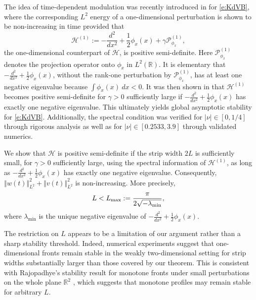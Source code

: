 \documentclass[final,11pt]{article}
\theoremstyle{definition} %
\newcommand{\lv}{\left\Vert}
\newcommand{\rv}{\right\Vert}
\theoremstyle{plain}
\theoremstyle{definition} %
\theoremstyle{remark}
\begin{document}
The idea of time-dependent modulation was recently introduced in \cite{BARKER2025} for \eqref{e:KdVB}, where the corresponding $L^2$ energy of a one-dimensional perturbation is shown to be non-increasing in time provided that 
\[
\mathcal{H}^{(1)}:=-\frac{d^2}{dx^2}+ \frac { 1 } { 2 } \phi _ { x }(x) + \gamma \mathcal{P}^{(1)}_{\phi_x},
\]
the one-dimensional counterpart of $\mathcal{H}$, is positive semi-definite. Here $\mathcal{P}^{(1)}_{\phi_x}$ denotes the projection operator onto $\phi_x$ in $L^2(\mathbb{R})$. It is elementary that $-\frac{d^2}{dx^2}+\frac12\phi_x(x)$, without the rank-one perturbation by $\mathcal{P}^{(1)}_{\phi_x}$, has at least one negative eigenvalue because $\int\phi_x(x)~dx<0$. It was then shown in \cite{BARKER2025} that $\mathcal{H}^{(1)}$ becomes positive semi-definite for $\gamma>0$ sufficiently large if $-\frac{d^2}{dx^2}+\frac12\phi_x(x)$ has exactly one negative eigenvalue. This ultimately yields global asymptotic stability for \eqref{e:KdVB}. Additionally, the spectral condition was verified for $|\nu| \in [0, 1/4]$ through rigorous analysis as well as for $|\nu|\in [0.2533, 3.9]$ through validated numerics. 

We show that $\mathcal{H}$ is positive semi-definite if the strip width $2L$ is sufficiently small, for $\gamma>0$ sufficiently large, using the spectral information of $\mathcal{H}^{(1)}$, as long as $-\frac{d^2}{dx^2}+\frac12\phi_x(x)$ has exactly one negative eigenvalue. Consequently, $\lv w(t)\rv_{L^2}^2+\lv v(t)\rv_{L^2}^2$ is non-increasing. More precisely, 
\[
L < L_{\text{\rm max}} := \frac{\pi}{2\sqrt{-\lambda_{\min}}},
\]
where $\lambda_{\min}$ is the unique negative eigenvalue of $-\frac{d^2}{dx^2} + \frac{1}{2}\phi_x(x)$. 

 The restriction on $L$ appears to be a limitation of our argument rather than a sharp stability threshold. Indeed, numerical experiments suggest that one-dimensional fronts remain stable in the weakly two-dimensional setting for strip widths substantially larger than those covered by our theorem. This is consistent with Rajopadhye's stability result for monotone fronts under small perturbations on the whole plane $\mathbb{R}^2$ \cite{Raj1996}, which suggests that monotone profiles may remain stable for arbitrary $L$.  
\end{document}
